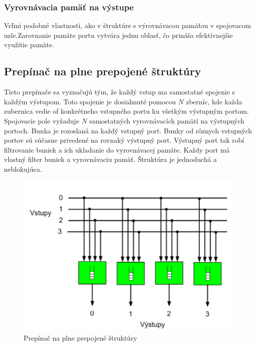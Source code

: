\subsubsection{Vyrovnávacia pamäť na výstupe}
Veľmi podobné vlastnosti, ako v štruktúre s výrovnávacou pamäťou v spojovacom uzle.Zarovnanie pamäte portu vytvára jednu oblasť, čo prináša efektívnejšie využitie pamäte.


\subsection{Prepínač na plne prepojené štruktúry}
Tieto prepínače sa vyznačujú tým, že každý vstup ma samostatné spojenie s každým výstupom. Toto spojenie je dosiahnuté pomocou $N$ zberníc, kde každa zubernica vedie of konkrétneho vstupného portu ku všetkým výstupným portom. Spojovacie pole vyžaduje $N$ samostatných vyrovnávacích pamätí na výstupných portoch. Bunka je rozoslaná na každý vstupný port. Bunky od rôznych vstupných portov sú súčasne privedené na rovnaký výstupný port. Výstupný port tak robí filtrovanie buniek a ich ukladanie do vyrovnávacej pamäte. Každy port má vlastný filter buniek a vyrovnávaciu pamäť. Štruktúra je jednoduchá a neblokujúca.

\begin{figure}[ht]
\centering
  \begin{center}
    \includegraphics[scale=0.8]{images/plne_prep.png}
  \end{center}
  \caption[Prepínač na plne prepojené štruktúry]{Prepínač na plne prepojené štruktúry}
\end{figure}

\newpage
